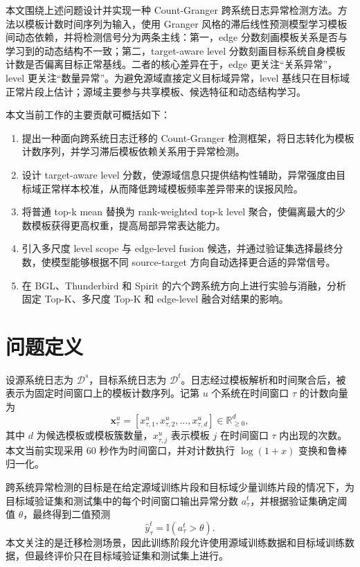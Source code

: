 \documentclass[UTF8,a4paper,zihao=-4]{ctexart}
\begin{document}
本文围绕上述问题设计并实现一种 Count-Granger 跨系统日志异常检测方法。方法以模板计数时间序列为输入，使用 Granger 风格的滞后线性预测模型学习模板间动态依赖，并将检测信号分为两条主线：第一，edge 分数刻画模板关系是否与学习到的动态结构不一致；第二，target-aware level 分数刻画目标系统自身模板计数是否偏离目标正常基线。二者的核心差异在于，edge 更关注“关系异常”，level 更关注“数量异常”。为避免源域直接定义目标域异常，level 基线只在目标域正常片段上估计；源域主要参与共享模板、候选特征和动态结构学习。

本文当前工作的主要贡献可概括如下：

\begin{enumerate}
  \item 提出一种面向跨系统日志迁移的 Count-Granger 检测框架，将日志转化为模板计数序列，并学习滞后模板依赖关系用于异常检测。
  \item 设计 target-aware level 分数，使源域信息只提供结构性辅助，异常强度由目标域正常样本校准，从而降低跨域模板频率差异带来的误报风险。
  \item 将普通 top-k mean 替换为 rank-weighted top-k level 聚合，使偏离最大的少数模板获得更高权重，提高局部异常表达能力。
  \item 引入多尺度 level scope 与 edge-level fusion 候选，并通过验证集选择最终分数，使模型能够根据不同 source-target 方向自动选择更合适的异常信号。
  \item 在 BGL、Thunderbird 和 Spirit 的六个跨系统方向上进行实验与消融，分析固定 Top-K、多尺度 Top-K 和 edge-level 融合对结果的影响。
\end{enumerate}

\section{问题定义}

设源系统日志为 $\mathcal{D}^{s}$，目标系统日志为 $\mathcal{D}^{t}$。日志经过模板解析和时间聚合后，被表示为固定时间窗口上的模板计数序列。记第 $u$ 个系统在时间窗口 $\tau$ 的计数向量为
\begin{equation}
  \mathbf{x}_{\tau}^{u} = [x_{\tau,1}^{u}, x_{\tau,2}^{u}, \ldots, x_{\tau,d}^{u}] \in \mathbb{R}_{\ge 0}^{d},
\end{equation}
其中 $d$ 为候选模板或模板簇数量，$x_{\tau,j}^{u}$ 表示模板 $j$ 在时间窗口 $\tau$ 内出现的次数。本文当前实现采用 60 秒作为时间窗口，并对计数执行 $\log(1+x)$ 变换和鲁棒归一化。

跨系统异常检测的目标是在给定源域训练片段和目标域少量训练片段的情况下，为目标域验证集和测试集中的每个时间窗口输出异常分数 $a_{\tau}^{t}$，并根据验证集确定阈值 $\theta$，最终得到二值预测
\begin{equation}
  \hat{y}_{\tau}^{t} = \mathbb{I}(a_{\tau}^{t} > \theta).
\end{equation}
本文关注的是迁移检测场景，因此训练阶段允许使用源域训练数据和目标域训练数据，但最终评价只在目标域验证集和测试集上进行。
\end{document}
